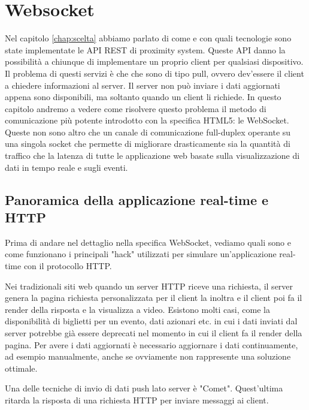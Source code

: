 \chapter{Websocket}
\label{chap:websocket}

Nel capitolo \ref{chap:scelta} abbiamo parlato di come e con quali tecnologie sono state implementate le API REST di proximity system.  
Queste API danno la possibilità a chiunque di implementare un proprio client per qualsiasi dispositivo. 
Il problema di questi servizi è che che sono di tipo pull, ovvero dev'essere il client a chiedere informazioni al server. 
Il server non può inviare i dati aggiornati appena sono disponibili,
ma soltanto quando un client li richiede.
In questo capitolo andremo a vedere come risolvere questo problema il metodo di comunicazione più potente introdotto con la specifica HTML5: le WebSocket.
Queste non sono altro che un canale di comunicazione full-duplex operante su una singola socket che permette di migliorare drasticamente sia la quantità di traffico che la latenza di tutte le applicazione web basate sulla visualizzazione di dati in tempo reale e sugli eventi.
  
\section{Panoramica della applicazione real-time e HTTP}
\label{sec:real-time}
Prima di andare nel dettaglio nella specifica WebSocket, vediamo quali sono e come funzionano i principali "hack" utilizzati per simulare un'applicazione real-time con il protocollo HTTP.

Nei tradizionali siti web quando un server HTTP riceve una richiesta, il server genera la pagina richiesta personalizzata per il client la inoltra e il client poi fa il render della risposta e la visualizza a video.
Esistono molti casi, come la disponibilità di biglietti per un evento, dati azionari etc. in cui i dati inviati dal server potrebbe già essere deprecati nel momento in cui il client fa il render della pagina. 
Per avere i dati aggiornati è necessario aggiornare i dati continuamente, ad esempio manualmente, anche se ovviamente non rappresente una soluzione ottimale.

Una delle tecniche di invio di dati push lato server è "Comet".
Quest'ultima ritarda la risposta di una richiesta HTTP per inviare messaggi ai client.

